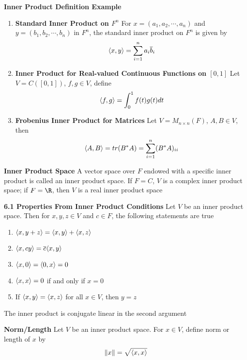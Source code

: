 \documentclass[11pt]{article}
\begin{document}
\begin{defn*}
    \textbf{Inner Product Definition Example}
    \begin{enumerate}
        \item \textbf{Standard Inner Product on $F^n$} For $x = (a_1,a_2,\cdots,a_n)$ and $y=(b_1,b_2,\cdots, b_n)$ in $F^n$, the standard inner product on $F^n$ is given by 
        \[
            \langle x,y\rangle = \sum_{i=1}^n a_i \overline{b}_i    
        \]
        \item \textbf{Inner Product for Real-valued Continuous Functions on $[0,1]$} Let $V=C([0,1])$, $f,g\in V$, define 
        \[
            \langle f,g\rangle = \int_0^1 f(t) g(t) dt    
        \]
        \item \textbf{Frobenius Inner Product for Matrices} Let $V=M_{n\times n}(F)$, $A,B\in V$, then 
        \[
            \langle A,B\rangle = tr(B^*A) = \sum_{i=1}^n (B^*A)_{ii}
        \]
    \end{enumerate}
\end{defn*}

\begin{defn*}
    \textbf{Inner Product Space} A vector space over $F$ endowed with a specific inner product is called an inner product space. If $F=C$, $V$ is a complex inner product space; if $F=\R$, then $V$ is a real inner product space
\end{defn*}

\begin{theorem*}
    \textbf{6.1 Properties From Inner Product Conditions} Let $V$ be an inner product space. Then for $x,y,z\in V$ and $c\in F$, the following statements are true 
    \begin{enumerate}
        \item $\langle x,y+z\rangle = \langle x,y\rangle + \langle x,z\rangle$
        \item $\langle x,cy\rangle = \overline{c} \langle x,y\rangle$
        \item $\langle x,0\rangle = \langle0,x\rangle = 0$
        \item $\langle x,x\rangle = 0$ if and only if $x=0$ 
        \item If $\langle x,y\rangle = \langle x,z\rangle$ for all $x\in V$, then $y=z$
    \end{enumerate}
    The inner product is conjugate linear in the second argument 
\end{theorem*}

\begin{defn*}
    \textbf{Norm/Length} Let $V$ be an inner product space. For $x\in V$, define norm or length of $x$ by 
    \[
        \left\lVert x\right\rVert = \sqrt{\langle x,x\rangle}    
    \]
\end{defn*}
\end{document}

